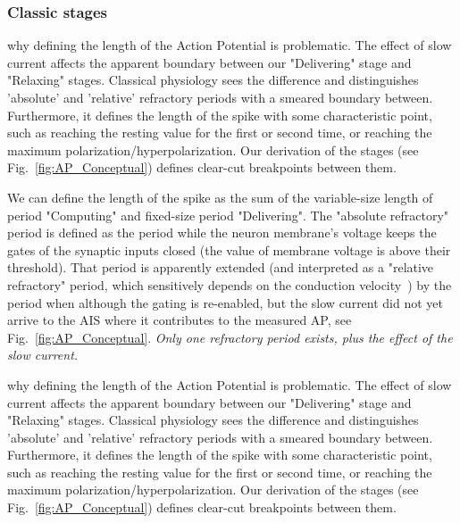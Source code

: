 \else

 
\subsubsection[Classic]{Classic stages\label{sec:Single-OperationClassicStages}}
\fi

\ifx\magyar\undefined


why defining the length of the Action Potential
is problematic.
The effect of slow current affects the apparent boundary between our
"Delivering" stage and "Relaxing" stages. 
Classical physiology sees the difference and distinguishes 'absolute' and 
'relative' refractory periods with a smeared boundary between. Furthermore,
it defines the length of the spike with some characteristic point,
such as reaching the resting value for the first or second time, or
reaching the maximum polarization/hyperpolarization.  Our derivation of the stages (see Fig.~\ref{fig:AP_Conceptual}) defines clear-cut breakpoints between them.

We can define the length of the spike as the sum of the variable-size length of period "Computing" and fixed-size period "Delivering". The "absolute refractory" 
period is defined as the period while the neuron membrane's voltage keeps
the gates of the synaptic inputs closed (the value of membrane voltage is above their threshold). That period is apparently extended 
(and interpreted as a "relative refractory" period, which sensitively depends
on the conduction velocity~\cite{APTemperatureDependenceRefractory:2001})
by the period when although the gating is re-enabled, but the slow current did not
yet arrive to the 
\gls{AIS}
where it contributes to the measured 
\gls{AP}, see Fig.~\ref{fig:AP_Conceptual}.  \textit{Only one refractory period exists,
plus the effect of the slow current.}

\else


why defining the length of the Action Potential
is problematic.
The effect of slow current affects the apparent boundary between our
"Delivering" stage and "Relaxing" stages. 
Classical physiology sees the difference and distinguishes 'absolute' and 
'relative' refractory periods with a smeared boundary between. Furthermore,
it defines the length of the spike with some characteristic point,
such as reaching the resting value for the first or second time, or
reaching the maximum polarization/hyperpolarization.  Our derivation of the stages (see Fig.~\ref{fig:AP_Conceptual}) defines clear-cut breakpoints between them.

